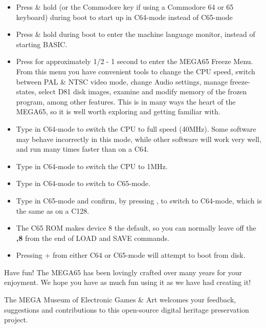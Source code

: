 \begin{itemize}

\item{Press \& hold \megasymbolkey (or the Commodore key if using a Commodore 64 or 65 keyboard) during boot to start up in C64-mode instead of C65-mode}
 \item{Press \& hold  during boot to enter the machine language monitor, instead of starting BASIC.}
\item{Press  for approximately 1/2 - 1 second to enter the MEGA65 Freeze Menu.  From this menu
  you have convenient tools to change the CPU speed, switch between PAL \& NTSC video mode, change Audio settings, manage freeze-states,
   select D81 disk images, examine and modify memory of the frozen program, among other features.  This is in many ways the heart of the MEGA65, so it is well worth exploring and getting familiar with.}
\item{Type  in C64-mode to switch  the CPU to full speed (40MHz). Some software may behave incorrectly in this mode, while other software will work very well, and run many times faster than on a C64.}
\item{Type  in C64-mode to switch the CPU to 1MHz.}
\item{Type  in C64-mode to switch to C65-mode.}
\item{Type  in C65-mode and confirm, by pressing , to switch to C64-mode, which is the
same as on a C128.}
\item{The C65 ROM makes device 8 the default, so you can normally leave off the \textbf{,8} from the end of LOAD and SAVE commands.}
\item{Pressing  +  from either C64 or C65-mode will attempt to boot from disk.}
\end{itemize}

Have fun! The MEGA65 has been lovingly crafted over many years for your enjoyment. We hope you have as much fun using it as we have had creating it!

The MEGA Museum of Electronic Games \& Art welcomes your feedback, suggestions and contributions to this open-source digital heritage preservation project.
